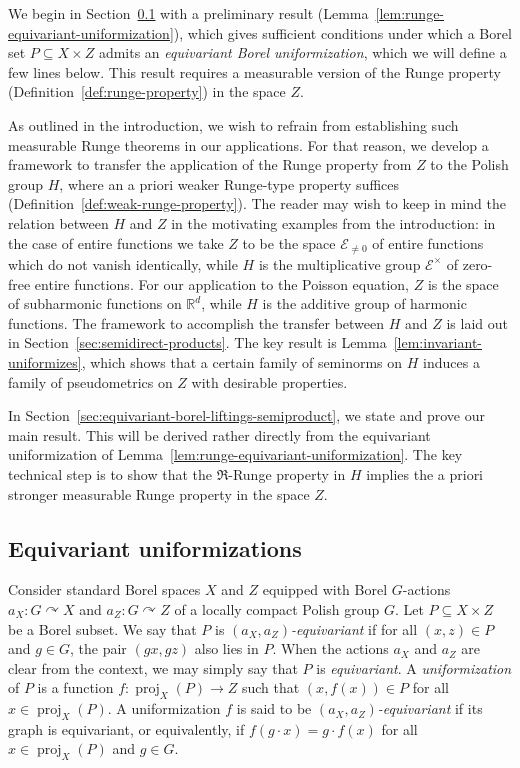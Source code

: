 \documentclass[12pt]{paper}
\numberwithin{equation}{section}
\theoremstyle{plain}
\theoremstyle{definition}
\newcommand{\Rd}{\mathbb{R}^{d}}
\newcommand{\mfR}{\mathfrak{R}}
\newcommand{\holomnz}[1][]{\mathcal{E}^{\times}_{#1}}
\newcommand{\holom}[1][]{\mathcal{E}_{#1}}
\DeclareMathOperator{\proj}{\mathrm{proj}}
\newcommand{\acts}{\curvearrowright}
\begin{document}
We begin in Section~\ref{sec:equiv-unif} with a preliminary result
(Lemma~\ref{lem:runge-equivariant-uniformization}), which gives sufficient conditions under which a
Borel set \(P \subseteq X \times Z\) admits an \emph{equivariant Borel uniformization}, which we will
define a few lines below.  This result requires a measurable version of the Runge property
(Definition~\ref{def:runge-property}) in the space \(Z\).

As outlined in the introduction, we wish to refrain from establishing such measurable Runge theorems
in our applications.  For that reason, we develop a framework to transfer the application of the
Runge property from \(Z\) to the Polish group \(H\), where an a priori weaker Runge-type property
suffices (Definition~\ref{def:weak-runge-property}). The reader may wish to keep in mind the
relation between \(H\) and \(Z\) in the motivating examples from the introduction: in the case of
entire functions we take \(Z\) to be the space \(\holom[\ne 0]\) of entire functions which do not
vanish identically, while \(H\) is the multiplicative group \(\holomnz\) of zero-free entire
functions.  For our application to the Poisson equation, \(Z\) is the space of subharmonic functions
on \(\Rd\), while \(H\) is the additive group of harmonic functions.  The framework to accomplish
the transfer between \(H\) and \(Z\) is laid out in Section~\ref{sec:semidirect-products}.  The key
result is Lemma~\ref{lem:invariant-uniformizes}, which shows that a certain family of seminorms on
\(H\) induces a family of pseudometrics on \(Z\) with desirable properties.

In Section~\ref{sec:equivariant-borel-liftings-semiproduct}, we state and prove our main
result. This will be derived rather directly from the equivariant uniformization of
Lemma~\ref{lem:runge-equivariant-uniformization}.  The key technical step is to show that the
\(\mfR\)-Runge property in \(H\) implies the a priori stronger measurable Runge property in the
space \(Z\).

\subsection{Equivariant uniformizations}
\label{sec:equiv-unif}

Consider standard Borel spaces \(X\) and \(Z\) equipped with Borel \(G\)-actions \(a_X : G \acts X\)
and \(a_Z : G \acts Z\) of a locally compact Polish group \(G\). Let \(P \subseteq X \times Z\) be a
Borel subset. We say that \(P\) is \emph{\((a_X, a_Z)\)-equivariant} if for all \((x, z) \in P\) and
\(g \in G\), the pair \((gx, gz)\) also lies in \(P\). When the actions \(a_X\) and \(a_Z\) are
clear from the context, we may simply say that \(P\) is \emph{equivariant}. A \emph{uniformization}
of \(P\) is a function \(f : \proj_X(P) \to Z\) such that \((x, f(x)) \in P\) for all
\(x \in \proj_X(P)\). A uniformization \(f\) is said to be \emph{\((a_X, a_Z)\)-equivariant} if its
graph is equivariant, or equivalently, if \(f(g\cdot x) = g\cdot f(x)\) for all \(x \in \proj_X(P)\)
and \(g \in G\).
\end{document}
